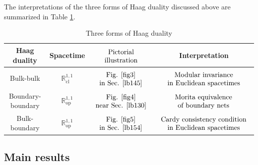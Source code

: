 \documentclass[11pt,b5paper,notitlepage]{article}
\theoremstyle{definition}
\theoremstyle{plain}
\newcommand{\Rcl}{\mathbb R^{1,1}_{\mathrm{cl}}}
\newcommand{\Rop}{\mathbb R^{1,1}_{\mathrm{op}}}
\numberwithin{equation}{section}
\begin{document}
The interpretations of the three forms of Haag duality discussed above are summarized in Table \ref{tb1}.


\begin{table}[h]
\centering
\begin{tabular}{|c|c|c|c|}
\hline Haag duality& Spacetime & $\begin{array}{c}
\rule{0pt}{0.42cm}\text{Pictorial}\\
\text{illustration}
\end{array}$ & Interpretation   \\
\hline Bulk-bulk   & $\Rcl$ & $\begin{array}{c}
\rule{0pt}{0.42cm}\text{Fig. \ref{fig3}}\\
\text{in Sec. \ref{lb145}}
\end{array}$  & $\begin{array}{c}
\rule{0pt}{0.42cm}\text{Modular invariance}\\
\text{in Euclidean spacetimes}
\end{array}$   \\
\hline Boundary-boundary  & $\Rop$ & $\begin{array}{c}
\rule{0pt}{0.42cm}\text{Fig. \ref{fig4}}\\
\text{near Sec. \ref{lb130}}
\end{array}$ & $\begin{array}{c}
\rule{0pt}{0.42cm}\text{Morita equivalence}\\
\text{of boundary nets}
\end{array}$   \\
\hline Bulk-boundary  & $\Rop$ & $\begin{array}{c}
\rule{0pt}{0.42cm}\text{Fig. \ref{fig5}}\\
\text{in Sec. \ref{lb154}}
\end{array}$ & $\begin{array}{c}
\rule{0pt}{0.42cm}\text{Cardy consistency condition}\\
\text{in Euclidean spacetimes}
\end{array}$  \\
\hline
\end{tabular}
\caption{Three forms of Haag duality}\label{tb1}
\end{table}



\subsection{Main results}
\end{document}
